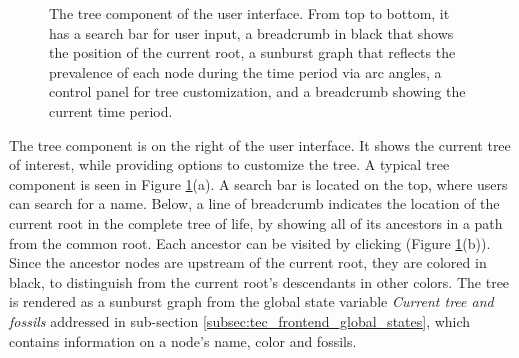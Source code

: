\documentclass[11pt, a4paper,oneside,chapterprefix=false]{scrbook}
\begin{document}
\begin{figure}[h]
	\caption{The tree component of the user interface. From top to bottom, it has a search bar for user input, a breadcrumb in black that shows the position of the current root, a sunburst graph that reflects the prevalence of each node during the time period via arc angles, a control panel for tree customization, and a breadcrumb showing the current time period.}
	\label{fig:tree}
\end{figure}
The tree component is on the right of the user interface. It shows the current tree of interest, while providing options to customize the tree. A typical tree component is seen in Figure \ref{fig:tree}(a). A search bar is located on the top, where users can search for a name. Below, a line of breadcrumb indicates the location of the current root in the complete tree of life, by showing all of its ancestors in a path from the common root. Each ancestor can be visited by clicking (Figure \ref{fig:tree}(b)). Since the ancestor nodes are upstream of the current root, they are colored in black, to distinguish from the current root's descendants in other colors. The tree is rendered as a sunburst graph from the global state variable \emph{Current tree and fossils} addressed in sub-section \ref{subsec:tec_frontend_global_states}, which contains information on a node's name, color and fossils. \\
\end{document}

